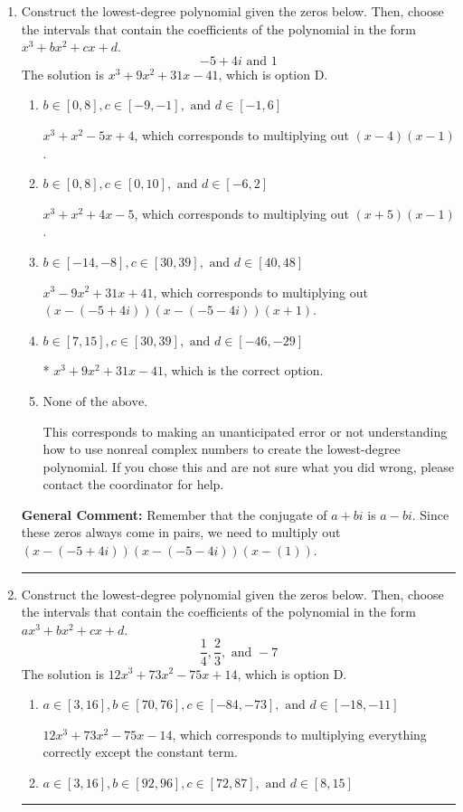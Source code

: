 \documentclass{extbook}[14pt]
\newcommand{\litem}[1]{\item #1

\rule{\textwidth}{0.4pt}}
\begin{document}
\begin{enumerate}\litem{
Construct the lowest-degree polynomial given the zeros below. Then, choose the intervals that contain the coefficients of the polynomial in the form $x^3+bx^2+cx+d$.
\[ -5 + 4 i \text{ and } 1 \]The solution is \( x^{3} +9 x^{2} +31 x -41 \), which is option D.\begin{enumerate}[label=\Alph*.]
\item \( b \in [0, 8], c \in [-9, -1], \text{ and } d \in [-1, 6] \)

$x^{3} + x^{2} -5 x + 4$, which corresponds to multiplying out $(x -4)(x -1)$.
\item \( b \in [0, 8], c \in [0, 10], \text{ and } d \in [-6, 2] \)

$x^{3} + x^{2} +4 x -5$, which corresponds to multiplying out $(x + 5)(x -1)$.
\item \( b \in [-14, -8], c \in [30, 39], \text{ and } d \in [40, 48] \)

$x^{3} -9 x^{2} +31 x + 41$, which corresponds to multiplying out $(x-(-5 + 4 i))(x-(-5 - 4 i))(x + 1)$.
\item \( b \in [7, 15], c \in [30, 39], \text{ and } d \in [-46, -29] \)

* $x^{3} +9 x^{2} +31 x -41$, which is the correct option.
\item \( \text{None of the above.} \)

This corresponds to making an unanticipated error or not understanding how to use nonreal complex numbers to create the lowest-degree polynomial. If you chose this and are not sure what you did wrong, please contact the coordinator for help.
\end{enumerate}

\textbf{General Comment:} Remember that the conjugate of $a+bi$ is $a-bi$. Since these zeros always come in pairs, we need to multiply out $(x-(-5 + 4 i))(x-(-5 - 4 i))(x-(1))$.
}
\litem{
Construct the lowest-degree polynomial given the zeros below. Then, choose the intervals that contain the coefficients of the polynomial in the form $ax^3+bx^2+cx+d$.
\[ \frac{1}{4}, \frac{2}{3}, \text{ and } -7 \]The solution is \( 12x^{3} +73 x^{2} -75 x + 14 \), which is option D.\begin{enumerate}[label=\Alph*.]
\item \( a \in [3, 16], b \in [70, 76], c \in [-84, -73], \text{ and } d \in [-18, -11] \)

$12x^{3} +73 x^{2} -75 x -14$, which corresponds to multiplying everything correctly except the constant term.
\item \( a \in [3, 16], b \in [92, 96], c \in [72, 87], \text{ and } d \in [8, 15] \)


\end{enumerate}}
\end{enumerate}
\end{document}
